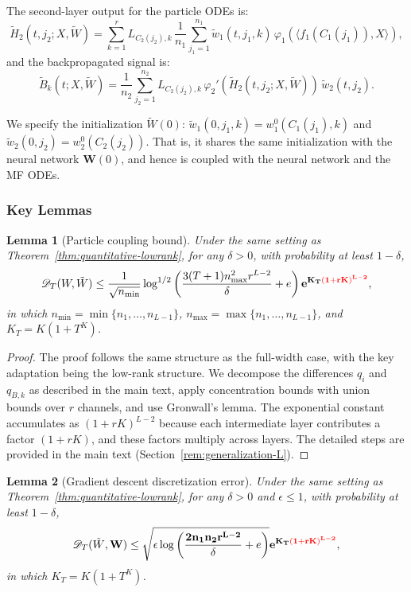 \documentclass[11pt]{article}
\newcommand{\1}{\mathbbm{1}}
\newtheorem{lemma}{Lemma}
\begin{document}
The second-layer output for the particle ODEs is:
\[
\tilde{H}_2(t, j_2; X, \tilde{W}) = \sum_{k=1}^r L_{C_2(j_2),k}\,\frac{1}{n_1}\sum_{j_1=1}^{n_1} \tilde{w}_1(t, j_1, k)\,\varphi_1(\langle f_1(C_1(j_1)), X\rangle),
\]
and the backpropagated signal is:
\[
\tilde{B}_k(t; X, \tilde{W}) = \frac{1}{n_2}\sum_{j_2=1}^{n_2} L_{C_2(j_2),k}\,\varphi_2'(\tilde{H}_2(t, j_2; X, \tilde{W}))\,\tilde{w}_2(t, j_2).
\]

We specify the initialization $\tilde{W}(0)$: $\tilde{w}_1(0, j_1, k) = w_1^0(C_1(j_1), k)$ and $\tilde{w}_2(0, j_2) = w_2^0(C_2(j_2))$. That is, it shares the same initialization with the neural network $\mathbf{W}(0)$, and hence is coupled with the neural network and the MF ODEs.

\subsubsection{Key Lemmas}

\begin{lemma}[Particle coupling bound]
\label{lem:particle-lowrank}
Under the same setting as Theorem~\ref{thm:quantitative-lowrank}, for any $\delta > 0$, with probability at least $1-\delta$,
\[
\mathscr{D}_T(W, \tilde{W}) \le \frac{1}{\sqrt{n_{\min}}}\log^{1/2}\left(\frac{3(T+1)n_{\max}^2r^{L-2}}{\delta} + e\right)\mathbf{e^{K_T\textcolor{red}{(1+rK)^{L-2}}}},
\]
in which $n_{\min} = \min\{n_1, \ldots, n_{L-1}\}$, $n_{\max} = \max\{n_1, \ldots, n_{L-1}\}$, and $K_T = K(1+T^K)$.
\end{lemma}

\begin{proof}
The proof follows the same structure as the full-width case, with the key adaptation being the low-rank structure. We decompose the differences $q_i$ and $q_{B,k}$ as described in the main text, apply concentration bounds with union bounds over $r$ channels, and use Gronwall's lemma. The exponential constant accumulates as $(1+rK)^{L-2}$ because each intermediate layer contributes a factor $(1+rK)$, and these factors multiply across layers. The detailed steps are provided in the main text (Section~\ref{rem:generalization-L}).
\end{proof}

\begin{lemma}[Gradient descent discretization error]
\label{lem:gradient-lowrank}
Under the same setting as Theorem~\ref{thm:quantitative-lowrank}, for any $\delta > 0$ and $\epsilon \le 1$, with probability at least $1-\delta$,
\[
\mathscr{D}_T(\tilde{W}, \mathbf{W}) \le \sqrt{\epsilon\log\left(\frac{\mathbf{2n_1n_2r^{L-2}}}{\delta} + e\right)}\mathbf{e^{K_T\textcolor{red}{(1+rK)^{L-2}}}},
\]
in which $K_T = K(1+T^K)$.
\end{lemma}
\end{document}
